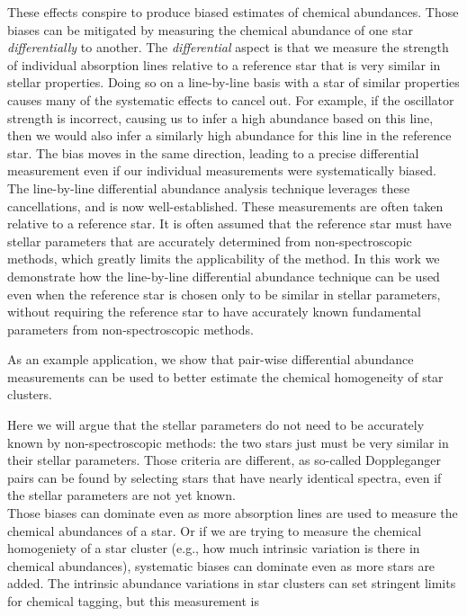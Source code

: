 \documentclass[modern]{aastex631}
\begin{document}
These effects conspire to produce biased estimates of chemical abundances. Those biases can be mitigated by measuring the chemical abundance of one star \emph{differentially} to another. The \emph{differential} aspect is that we measure the strength of individual absorption lines relative to a reference star that is very similar in stellar properties. Doing so on a line-by-line basis with a star of similar properties causes many of the systematic effects to cancel out. For example, if the oscillator strength is incorrect, causing us to infer a high abundance based on this line, then we would also infer a similarly high abundance for this line in the reference star. The bias moves in the same direction, leading to a precise differential measurement even if our individual measurements were systematically biased.\\

The line-by-line differential abundance analysis technique leverages these cancellations, and is now well-established. These measurements are often taken relative to a reference star. It is often assumed that the reference star must have stellar parameters that are accurately determined from non-spectroscopic methods, which greatly limits the applicability of the method. In this work we demonstrate how the line-by-line differential abundance technique can be used even when the reference star is chosen only to be similar in stellar parameters, without requiring the reference star to have accurately known fundamental parameters from non-spectroscopic methods. 


As an example application, we show that pair-wise differential abundance measurements can be used to better estimate the chemical homogeneity of star clusters. 






Here we will argue that the stellar parameters do not need to be accurately known by non-spectroscopic methods: the two stars just must be very similar in their stellar parameters. Those criteria are different, as so-called Doppleganger pairs can be found by selecting stars that have nearly identical spectra, even if the stellar parameters are not yet known.\\

Those biases can dominate even as more absorption lines are used to measure the chemical abundances of a star. Or if we are trying to measure the chemical homogeniety of a star cluster (e.g., how much intrinsic variation is there in chemical abundances), systematic biases can dominate even as more stars are added. The intrinsic abundance variations in star clusters can set stringent limits for chemical tagging, but this measurement is 
\end{document}
